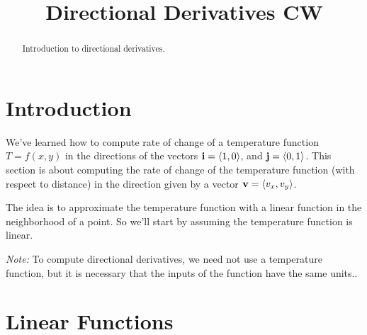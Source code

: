 \documentclass{ximera}
\title{Directional Derivatives CW}
\begin{document}
\begin{abstract}
Introduction to directional derivatives.
\end{abstract}
\maketitle

\section{Introduction}

We've learned how to compute rate of change of a temperature function $T=f(x,y)$ in the directions of the vectors ${\bf i} = \langle 1, 0\rangle$, and ${\bf j} = \langle 0, 1 \rangle$. This section is about computing the rate of change of the temperature function (with respect to distance) in the direction given by a vector ${\bf v} = \langle v_x ,v_y \rangle$. 

The idea is to approximate the temperature function with a linear function in the neighborhood of a point. So we'll start by assuming the temperature function is linear.

\emph{Note:} To compute directional derivatives, we need not use a temperature function, but it is necessary that the inputs of the function have the same units..


\section{Linear Functions}
\end{document}
